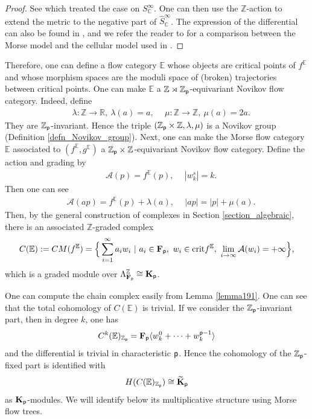 \documentclass[reqno, 10pt]{amsart}
\numberwithin{equation}{section}
\numberwithin{equation}{section}
\theoremstyle{definition}
\theoremstyle{remark}
\newcommand{\beqn}{\begin{equation*}}
\newcommand{\eeqn}{\end{equation*}}
\newcommand{\mb}{\mathbb}
\newcommand{\mc}{\mathcal}
\newcommand{\p}{{\sf p}}
\newcommand{\fp}{{\bf F}_{\sf p}}
\newcommand{\kp}{{\bf K}_{\sf p}}
\newcommand{\tkp}{\wt{\bf K}_{\sf p}}
\newcommand{\zp}{{{\mb Z}_{\sf p}}}
\newcommand{\ep}{{{\mathbb E}}}
\newcommand{\wt}{\widetilde}
\newcommand{\wh}{\widehat}
\begin{document}
\begin{proof}
See \cite[Section 4]{shelukhin-zhao} which treated the case on $S_{\mb C}^\infty$. One can then use the ${\mb Z}$-action to extend the metric to the negative part of $\wh S_{\mb C}^\infty$. The expression of the differential can also be found in \cite[Section 2]{Seidel_Wilkins_2022}, and we refer the reader to \cite[Appendix A]{BSWX} for a comparison between the Morse model and the cellular model used in \cite{Seidel_Wilkins_2022}.
\end{proof}

Therefore, one can define a flow category $\ep$ whose objects are critical points of $f^\ep$ and whose morphism spaces are the moduli space of (broken) trajectories between critical points. One can make $\ep$ a ${\mb Z} \rtimes \zp$-equivariant Novikov flow category. Indeed, define
\begin{align*}
&\ \lambda: {\mb Z} \to {\mb R},\ \lambda(a) = a,\ &\ \mu: {\mb Z} \to {\mb Z},\ \mu(a) = 2a.
\end{align*}
They are $\zp$-invariant. Hence the triple $(\zp \times {\mb Z}, \lambda, \mu)$ is a Novikov group (Definition \ref{defn_Novikov_group}). Next, one can make the Morse flow category $\ep$ associated to $(f^\ep, g^\ep)$ a $\zp \times {\mb Z}$-equivariant Novikov flow category. Define the action and grading by
\begin{align*}
&\ {\mc A}(p) = f^\ep(p),\ &\ |w_k^s| = k.
\end{align*}
Then one can see 
\begin{align*}
&\ {\mc A}(ap) = f^{\ep}(p) + \lambda(a),\ &\ |ap| = |p| + \mu(a).
\end{align*}
Then, by the general construction of complexes in Section \ref{section_algebraic}, there is an associated ${\mb Z}$-graded complex
\beqn
C({\mb E}):= CM(f^\ep) = \Big\{ \sum_{i=1}^\infty a_i w_i\ |\ a_i \in \fp,\ w_i \in {\rm crit} f^\ep,\ \lim_{i \to \infty} {\mc A} (w_i) = +\infty \Big\},
\eeqn
which is a graded module over $\Lambda_{\fp}^{\mb Z} \cong \kp$.

One can compute the chain complex easily from Lemma \ref{lemma191}. One can see that the total cohomology of $C({\mb E})$ is trivial. If we consider the $\zp$-invariant part, then in degree $k$, one has 
\beqn
C^k (\ep)_{\zp} = \fp \langle w_k^0 + \cdots + w_k^{\p-1} \rangle
\eeqn
and the differential is trivial in characteristic $\p$. Hence the cohomology of the $\zp$-fixed part is identified with
\beqn
H( C({\mb E})_{\zp}) \cong \tkp
\eeqn
as $\kp$-modules. We will identify below its multiplicative structure using Morse flow trees.
\end{document}
